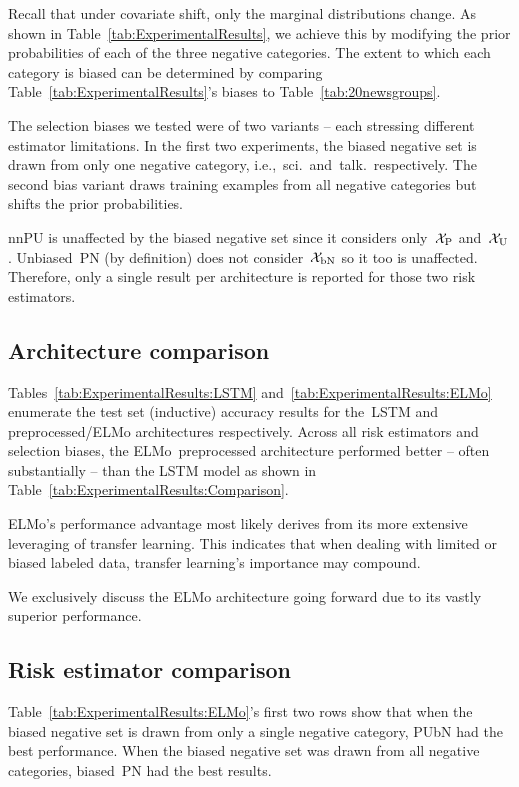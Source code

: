 Recall that under covariate shift, only the marginal distributions change.  As shown in Table~\eqref{tab:ExperimentalResults}, we achieve this by modifying the prior probabilities of each of the three negative categories.  The extent to which each category is biased can be determined by comparing Table~\ref{tab:ExperimentalResults}'s biases to Table~\ref{tab:20newsgroups}.

The selection biases we tested were of two variants -- each stressing different estimator limitations.  In the first two experiments, the biased negative set is drawn from only one negative category, i.e.,~sci.\ and~talk.\ respectively.  The second bias variant draws training examples from all negative categories but shifts the prior probabilities.

nnPU is unaffected by the biased negative set since it considers only~$\mathcal{X}_{\textnormal{P}}$ and~$\mathcal{X}_{\textnormal{U}}$.  Unbiased~PN (by definition) does not consider~$\mathcal{X}_{\textnormal{bN}}$ so it too is unaffected.  Therefore, only a single result per architecture is reported for those two risk estimators.

\subsection{Architecture comparison}

Tables~\ref{tab:ExperimentalResults:LSTM} and~\ref{tab:ExperimentalResults:ELMo} enumerate the test set (inductive) accuracy results for the~LSTM and preprocessed\-/ELMo architectures respectively.  Across all risk estimators and selection biases, the ELMo~preprocessed architecture performed better -- often substantially -- than the LSTM model as shown in Table~\ref{tab:ExperimentalResults:Comparison}.

ELMo's performance advantage most likely derives from its more extensive leveraging of transfer learning.  This indicates that when dealing with limited or biased labeled data, transfer learning's importance may compound.

We exclusively discuss the ELMo architecture going forward due to its vastly superior performance.

\subsection{Risk estimator comparison}

Table~\ref{tab:ExperimentalResults:ELMo}'s first two rows show that when the biased negative set is drawn from only a single negative category, PUbN had the best performance.  When the biased negative set was drawn from all negative categories, biased~PN had the best results.

